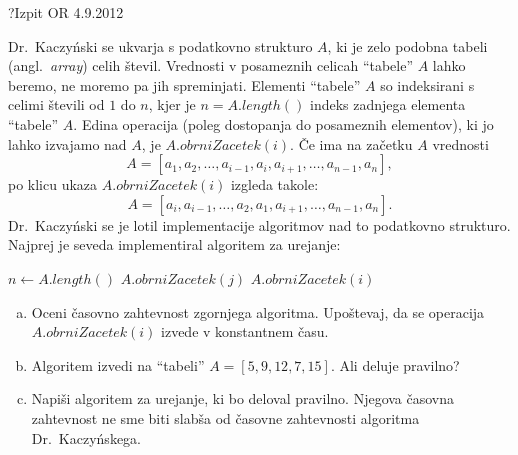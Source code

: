 \begin{naloga}{?}{Izpit OR 4.9.2012}
\begin{vprasanje}
Dr.~Kaczyński se ukvarja s podatkovno strukturo $A$,
ki je zelo podobna tabeli (angl.~{\em array}) celih števil.
Vrednosti v posameznih celicah ``tabele'' $A$ lahko beremo,
ne moremo pa jih spreminjati.
Elementi ``tabele'' $A$ so indeksirani s celimi števili od $1$ do $n$,
kjer je $n = A.length()$ indeks zadnjega elementa ``tabele'' $A$.
Edina operacija (poleg dostopanja do posameznih elementov),
ki jo lahko izvajamo nad $A$, je $A.obrniZacetek(i)$.
Če ima na začetku $A$ vrednosti
$$
A = [a_1, a_2, \dots, a_{i-1}, a_i, a_{i+1}, \dots, a_{n-1}, a_n],
$$
po klicu ukaza $A.obrniZacetek(i)$ izgleda takole:
$$
A = [a_i, a_{i-1}, \dots, a_2, a_1, a_{i+1}, \dots, a_{n-1}, a_n] .
$$
Dr.~Kaczyński se je lotil implementacije algoritmov
nad to podatkovno strukturo.
Najprej je seveda implementiral algoritem za urejanje:
\begin{small}
\begin{algorithmic}
\State $n \gets A.length()$
            \State $A.obrniZacetek(j)$
            \State $A.obrniZacetek(i)$
        \EndIf
    \EndFor
\EndFor
\end{algorithmic}
\end{small}

\begin{enumerate}[(a)]
\item Oceni časovno zahtevnost zgornjega algoritma.
Upoštevaj, da se operacija $A.obrniZacetek(i)$ izvede v konstantnem času.

\item Algoritem izvedi na ``tabeli'' $A = [5, 9, 12, 7, 15]$.
Ali deluje pravilno?

\item Napiši algoritem za urejanje, ki bo deloval pravilno.
Njegova časovna zahtevnost ne sme biti slabša
od časovne zahtevnosti algoritma Dr.~Kaczyńskega.
\end{enumerate}
\end{vprasanje}
\begin{odgovor}
\end{odgovor}
\end{naloga}
